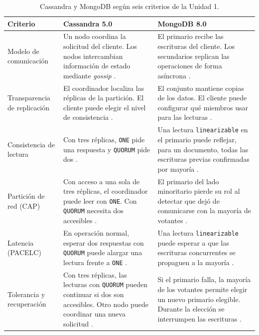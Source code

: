 \documentclass[11pt,a4paper]{article}
\begin{document}
\begin{table}[H]
  \centering
  \caption{Cassandra y MongoDB según seis criterios de la Unidad 1.}
  \label{tab:cassandra-mongodb}
  \small
  \renewcommand{\arraystretch}{1.14}
  \begin{tabularx}{\linewidth}{@{}p{.20\linewidth}XX@{}}
    \toprule
    \textbf{Criterio} & \textbf{Cassandra 5.0} & \textbf{MongoDB 8.0} \\
    \midrule
    Modelo de comunicación &
    Un nodo coordina la solicitud del cliente. Los nodos intercambian información de estado mediante \emph{gossip} \cite{cassandra5dynamo}. &
    El primario recibe las escrituras del cliente. Los secundarios replican las operaciones de forma asíncrona \cite{mongodb8replication}. \\
    \addlinespace
    Transparencia de replicación &
    El coordinador localiza las réplicas de la partición. El cliente puede elegir el nivel de consistencia \cite{cassandra5dynamo}. &
    El conjunto mantiene copias de los datos. El cliente puede configurar qué miembros usar para las lecturas \cite{mongodb8replication}. \\
    \addlinespace
    Consistencia de lectura &
    Con tres réplicas, \texttt{ONE} pide una respuesta y \texttt{QUORUM} pide dos \cite{cassandra5dynamo}. &
    Una lectura \texttt{linearizable} en el primario puede reflejar, para un documento, todas las escrituras previas confirmadas por mayoría \cite{mongodb8linearizable}. \\
    \addlinespace
    Partición de red (CAP) &
    Con acceso a una sola de tres réplicas, el coordinador puede leer con \texttt{ONE}. Con \texttt{QUORUM} necesita dos accesibles \cite{cassandra5dynamo}. &
    El primario del lado minoritario pierde su rol al detectar que dejó de comunicarse con la mayoría de votantes \cite{mongodb8elections}. \\
    \addlinespace
    Latencia (PACELC) &
    En operación normal, esperar dos respuestas con \texttt{QUORUM} puede alargar una lectura frente a \texttt{ONE} \cite{cassandra5dynamo,abadi2012pacelc}. &
    Una lectura \texttt{linearizable} puede esperar a que las escrituras concurrentes se propaguen a la mayoría \cite{mongodb8linearizable}. \\
    \addlinespace
    Tolerancia y recuperación &
    Con tres réplicas, las lecturas con \texttt{QUORUM} pueden continuar si dos son accesibles. Otro nodo puede coordinar una nueva solicitud \cite{cassandra5dynamo}. &
    Si el primario falla, la mayoría de los votantes permite elegir un nuevo primario elegible. Durante la elección se interrumpen las escrituras \cite{mongodb8elections}. \\
    \bottomrule
  \end{tabularx}
\end{table}
\end{document}
